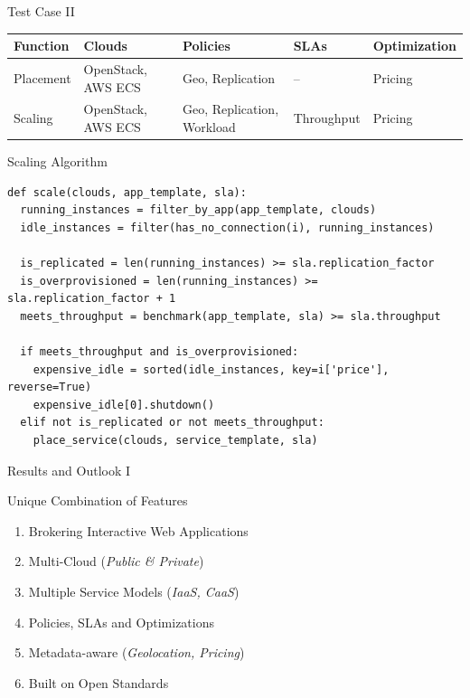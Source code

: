 \documentclass{beamer}
\newcommand{\ra}[1]{\renewcommand{\arraystretch}{#1}}
\begin{document}
\begin{frame}{Test Case II}
\vfill
\begin{table}
\ra{1.3}%
\begin{tabularx}{\textwidth}{LLLLL}%
	\toprule%
	Function & Clouds & Policies & SLAs & Optimization\\%
	\midrule%
	Placement & OpenStack, AWS ECS & Geo, Replication & -- & Pricing\\%
	Scaling   & OpenStack, AWS ECS & Geo, Replication, Workload & Throughput & Pricing\\%
\end{tabularx}
\end{table}
\vfill
\end{frame}


\begin{frame}[fragile]{Scaling Algorithm}
\begin{verbatim}
def scale(clouds, app_template, sla):
  running_instances = filter_by_app(app_template, clouds)
  idle_instances = filter(has_no_connection(i), running_instances)

  is_replicated = len(running_instances) >= sla.replication_factor
  is_overprovisioned = len(running_instances) >= sla.replication_factor + 1
  meets_throughput = benchmark(app_template, sla) >= sla.throughput
 
  if meets_throughput and is_overprovisioned:
    expensive_idle = sorted(idle_instances, key=i['price'], reverse=True)
    expensive_idle[0].shutdown()
  elif not is_replicated or not meets_throughput:
    place_service(clouds, service_template, sla)
\end{verbatim}
\end{frame}


\begin{frame}{Results and Outlook I}
	\begin{block}{Unique Combination of Features}
	\begin{enumerate}
		\item Brokering Interactive Web Applications
		\item Multi-Cloud (\emph{Public \& Private})
		\item Multiple Service Models (\emph{IaaS, CaaS})
		\item Policies, SLAs and Optimizations
		\item Metadata-aware (\emph{Geolocation, Pricing})
		\item Built on Open Standards
	\end{enumerate}
\end{block}
\end{frame}
\end{document}
